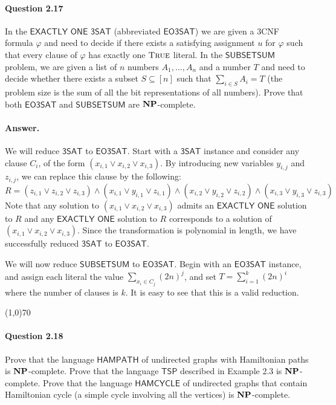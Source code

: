 \paragraph{Question 2.17}

In the $\mathsf{EXACTLY}$ $\mathsf{ONE}$ $\mathsf{3SAT}$ (abbreviated $\mathsf{EO3SAT}$) we are given a 3CNF formula $\varphi$ and need to decide if there exists a satisfying assignment $u$ for $\varphi$ such that every clause of $\varphi$ has exactly one $\textsc{True}$ literal. In the $\mathsf{SUBSETSUM}$ problem, we are given a list of $n$ numbers $A_1,\dots,A_n$ and a number $T$ and need to decide whether there exists a subset $S\subseteq[n]$ such that $\sum_{i\in S} A_i=T$ (the problem size is the sum of all the bit representations of all numbers). Prove that both $\mathsf{EO3SAT}$ and $\mathsf{SUBSETSUM}$ are $\mathbf{NP}$-complete.

\paragraph{Answer.} We will reduce $\mathsf{3SAT}$ to $\mathsf{EO3SAT}$. Start with a $\mathsf{3SAT}$ instance and consider any clause $C_i$, of the form $(x_{i,1}\vee x_{i,2}\vee x_{i,3})$. By introducing new variables $y_{i,j}$ and $z_{i,j}$, we can replace this clause by the following:
\begin{equation*}
	R=(z_{i,1}\vee z_{i,2}\vee z_{i,3})\wedge(x_{i,1}\vee y_{i,1}\vee z_{i,1})\wedge(x_{i,2}\vee y_{i,2}\vee z_{i,2})\wedge(x_{i,3}\vee y_{i,3}\vee z_{i,3})
\end{equation*}
Note that any solution to $(x_{i,1}\vee x_{i,2}\vee x_{i,3})$ admits an $\mathsf{EXACTLY}$ $\mathsf{ONE}$ solution to $R$ and any $\mathsf{EXACTLY}$ $\mathsf{ONE}$ solution to $R$ corresponds to a solution of $(x_{i,1}\vee x_{i,2}\vee x_{i,3})$. Since the transformation is polynomial in length, we have successfully reduced $\mathsf{3SAT}$ to $\mathsf{EO3SAT}$.

We will now reduce $\mathsf{SUBSETSUM}$ to $\mathsf{EO3SAT}$. Begin with an $\mathsf{EO3SAT}$ instance, and assign each literal the value $\sum_{x_i\in C_j}(2n)^j$, and set $T=\sum_{i=1}^{k}(2n)^i$ where the number of clauses is $k$. It is easy to see that this is a valid reduction.

\begin{center}
	\line(1,0){70}
\end{center}

\paragraph{Question 2.18} Prove that the language $\mathsf{HAMPATH}$ of undirected graphs with Hamiltonian paths is $\mathbf{NP}$-complete. Prove that the language $\mathsf{TSP}$ described in Example 2.3 is $\mathbf{NP}$-complete. Prove that the language $\mathsf{HAMCYCLE}$ of undirected graphs that contain Hamiltonian cycle (a simple cycle involving all the vertices) is $\mathbf{NP}$-complete.

